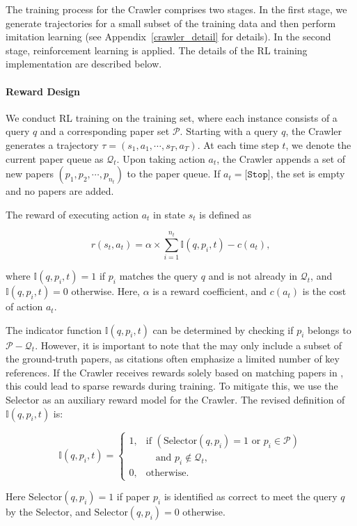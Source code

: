 The training process for the Crawler comprises two stages. In the first stage, we generate trajectories for a small subset of the training data and then perform imitation learning (see Appendix~\ref{crawler_detail} for details).  In the second stage, reinforcement learning is applied. The details of the RL training implementation are described below.

\paragraph{Reward Design}

We conduct RL training on the \autoS training set, where each instance consists of a query $q$ and a corresponding paper set $\mathcal{P}$. 
Starting with a query $q$, the Crawler generates a trajectory $\tau=(s_1, a_1, \cdots, s_T, a_T)$. At each time step $t$, we denote the current paper queue as $\mathcal{Q}_t$. Upon taking action $a_t$, the Crawler appends a set of new papers $(p_1, p_2, \cdots, p_{n_t})$ to the paper queue. If $a_t = \texttt{[Stop]}$, the set is empty and no papers are added.

The reward of executing action $a_t$ in state $s_t$ is defined as

\begin{small}
\begin{equation}\label{action_reward}
    r(s_t, a_t) = \alpha\times\sum_{i=1}^{n_t} \mathbb{I}(q, p_i, t) - c(a_t),
\end{equation}
\end{small}
where $\mathbb{I}(q, p_i, t)=1$ if $p_i$ matches the query $q$ and is not already in $\mathcal{Q}_t$, and $\mathbb{I}(q, p_i, t)=0$ otherwise. Here, $\alpha$ is a reward coefficient, and $c(a_t)$ is the cost of action $a_t$.

The indicator function $\mathbb{I}(q, p_i, t)$ can be determined by checking if $p_i$ belongs to $\mathcal{P}-\mathcal{Q}_t$. However, it is important to note that the \autoS may only include a subset of the ground-truth papers, as citations often emphasize a limited number of key references. If the Crawler receives rewards solely based on matching papers in \autoS, this could lead to sparse rewards during training. To mitigate this, we use the Selector as an auxiliary reward model for the Crawler. The revised definition of $\mathbb{I}(q, p_i, t)$ is:

\begin{small}
\begin{equation}
\mathbb{I}(q, p_i, t) = 
\begin{cases}
1, & \text{if } \left( \text{Selector}(q, p_i) = 1 \text{ or } p_i \in \mathcal{P} \right) \\
& \quad \text{and } p_i \notin \mathcal{Q}_t, \\
0, & \text{otherwise.}
\end{cases}
\end{equation}
\end{small}
Here $\text{Selector}(q, p_i)=1$ if paper $p_i$ is identified as correct to meet the query $q$ by the Selector, and $\text{Selector}(q, p_i)=0$ otherwise.

